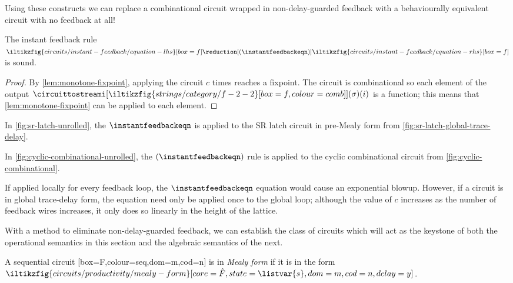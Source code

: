 Using these constructs we can replace a combinational circuit wrapped in
non-delay-guarded feedback with a behaviourally equivalent circuit with no
feedback at all!

\begin{proposition}\label{prop:instant-feedback}
    The instant feedback rule \(
    \iltikzfig{circuits/instant-feedback/equation-lhs}[box=f]
    \reduction[(\instantfeedbackeqn)]
    \iltikzfig{circuits/instant-feedback/equation-rhs}[box=f]
    \) is sound.
\end{proposition}
\begin{proof}
    By \cref{lem:monotone-fixpoint}, applying the circuit \(c\)
    times reaches a fixpoint.
    The circuit is combinational so each element of the output
    \(\circuittostreami[
        \iltikzfig{strings/category/f-2-2}[box=f,colour=comb]
    ](\sigma)(i)\) is a function; this means that \cref{lem:monotone-fixpoint}
    can be applied to each element.
\end{proof}

\begin{example}
    In \cref{fig:sr-latch-unrolled}, the \(\instantfeedbackeqn\) is applied to
    the SR latch circuit in pre-Mealy form from
    \cref{fig:sr-latch-global-trace-delay}.
\end{example}

\begin{example}
    In \cref{fig:cyclic-combinational-unrolled}, the \((\instantfeedbackeqn)\)
    rule is applied to the cyclic combinational circuit from
    \cref{fig:cyclic-combinational}.
\end{example}




If applied locally for every feedback loop, the \(\instantfeedbackeqn\)
equation would cause an exponential blowup.
However, if a circuit is in global trace-delay form, the equation need only be
applied once to the global loop; although the value of \(c\) increases as the
number of feedback wires increases, it only does so linearly in the height of
the lattice.

With a method to eliminate non-delay-guarded feedback, we can establish the
class of circuits which will act as the keystone of both the operational
semantics in this section and the algebraic semantics of the next.

\begin{definition}\label{def:delay-guarded}
    A sequential circuit
    [box=F,colour=seq,dom=m,cod=n]
    is in \emph{Mealy form} if it is in the form \(
    \iltikzfig{circuits/productivity/mealy-form}[core=\hat{F},state=\listvar{s},dom=m,cod=n,delay=y]
    \).
\end{definition}

